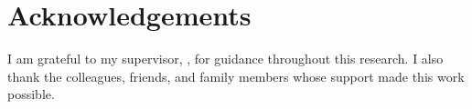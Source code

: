 \chapter*{Acknowledgements}

I am grateful to my supervisor, \thesissupervisor, for guidance throughout
this research. I also thank the colleagues, friends, and family members whose
support made this work possible.
